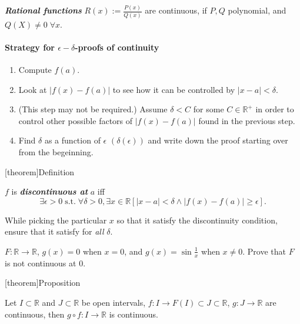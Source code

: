 \documentclass[12pt]{report}
\theoremstyle{definition}
\begin{document}
\begin{ex}
    \textbf{\emph{Rational functions}} $R(x):=\frac{P(x)}{Q(x)}$ are continuous,
    if $P, Q$ polynomial, and $Q(X) \neq 0 \;\forall x$.
\end{ex}


\paragraph{Strategy for $\epsilon-\delta$-proofs of continuity}
\begin{enumerate}
    \item Compute $f(a)$.
    \item Look at $|f(x)-f(a)|$ to see how it can be controlled by $|x-a|<\delta$.
    \item (This step may not be required.) Assume $\delta<C$ for some $C\in\mathbb{R}^{+}$
        in order to control other possible factors of $|f(x) - f(a)|$ found in the previous step.
    \item Find $\delta$ as a function of $\epsilon$ $(\delta(\epsilon))$ and write down
        the proof starting over from the begeinning.
\end{enumerate}

[theorem]{Definition}
\begin{discontinuous at a}
    $f$ is \textbf{\emph{discontinuous at}} $a$ iff\[
        \exists \epsilon>0 \;\text{s.t.}\; \forall\delta>0,
        \exists x\in\mathbb{R} [|x-a|<\delta \wedge|f(x)-f(a)|\ge\epsilon].
    \]
\end{discontinuous at a}

While picking the particular $x$ so that it satisfy the discontinuity condition,
ensure that it satisfy for \emph{all} $\delta$.
\begin{ex}
    $F:\mathbb{R}\rightarrow{}\mathbb{R}$,
    $g(x)=0$ when $x=0$, and $g(x) = \sin{\frac{1}{x}}$ when $x\neq 0$.
    Prove that $F$ is not continuous at 0.
\end{ex}

[theorem]{Proposition}
\begin{continiuos function composition is continuous}
    Let $I \subset \mathbb{R}$ and $J \subset \mathbb{R}$ be open intervals,
    $f:I\rightarrow{}F(I)\subset J \subset\mathbb{R}$, 
    $g:J\rightarrow{}\mathbb{R}$ are continuous,
    then $g\circ f:I\rightarrow{}\mathbb{R}$ is continuous.
\end{continiuos function composition is continuous}
\end{document}
